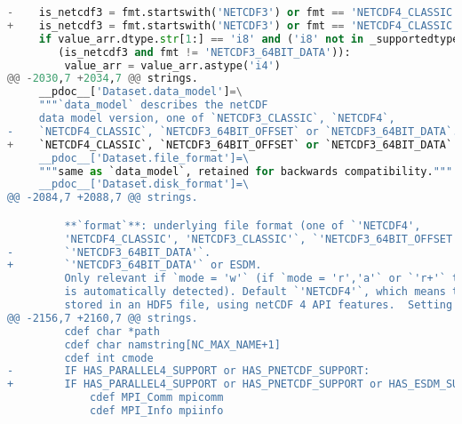 \begin{lstlisting}[language=python,upquote=true]
-    is_netcdf3 = fmt.startswith('NETCDF3') or fmt == 'NETCDF4_CLASSIC'
+    is_netcdf3 = fmt.startswith('NETCDF3') or fmt == 'NETCDF4_CLASSIC' or fmt == 'ESDM'
     if value_arr.dtype.str[1:] == 'i8' and ('i8' not in _supportedtypes or\
        (is_netcdf3 and fmt != 'NETCDF3_64BIT_DATA')):
         value_arr = value_arr.astype('i4')
@@ -2030,7 +2034,7 @@ strings.
     __pdoc__['Dataset.data_model']=\
     """`data_model` describes the netCDF
     data model version, one of `NETCDF3_CLASSIC`, `NETCDF4`,
-    `NETCDF4_CLASSIC`, `NETCDF3_64BIT_OFFSET` or `NETCDF3_64BIT_DATA`."""
+    `NETCDF4_CLASSIC`, `NETCDF3_64BIT_OFFSET` or `NETCDF3_64BIT_DATA` or ESDM."""
     __pdoc__['Dataset.file_format']=\
     """same as `data_model`, retained for backwards compatibility."""
     __pdoc__['Dataset.disk_format']=\
@@ -2084,7 +2088,7 @@ strings.

         **`format`**: underlying file format (one of `'NETCDF4',
         'NETCDF4_CLASSIC', 'NETCDF3_CLASSIC'`, `'NETCDF3_64BIT_OFFSET'` or
-        `'NETCDF3_64BIT_DATA'`.
+        `'NETCDF3_64BIT_DATA'` or ESDM.
         Only relevant if `mode = 'w'` (if `mode = 'r','a'` or `'r+'` the file format
         is automatically detected). Default `'NETCDF4'`, which means the data is
         stored in an HDF5 file, using netCDF 4 API features.  Setting
@@ -2156,7 +2160,7 @@ strings.
         cdef char *path
         cdef char namstring[NC_MAX_NAME+1]
         cdef int cmode
-        IF HAS_PARALLEL4_SUPPORT or HAS_PNETCDF_SUPPORT:
+        IF HAS_PARALLEL4_SUPPORT or HAS_PNETCDF_SUPPORT or HAS_ESDM_SUPPORT:
             cdef MPI_Comm mpicomm
             cdef MPI_Info mpiinfo


\end{lstlisting}
